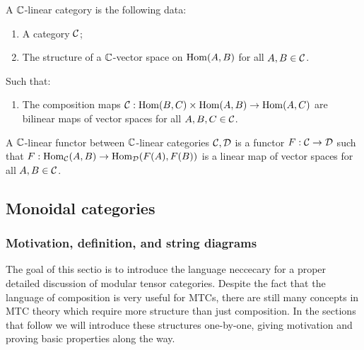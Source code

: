 
\begin{defn} A ${\mathbb C}$-linear category is the following data:

\begin{enumerate}
\item A category ${\mathcal C}$;
\item The structure of a ${\mathbb C}$-vector space on $\operatorname{Hom}(A,B)$ for all $A,B\in {\mathcal C}$.

\end{enumerate}

Such that:

\begin{enumerate}

\item The composition maps ${\mathcal C}:\operatorname{Hom}(B,C)\times \operatorname{Hom}(A,B)\to \operatorname{Hom}(A,C)$ are bilinear maps of vector spaces for all $A,B,C\in {\mathcal C}$.
\end{enumerate}

\raggedleft\qedsymbol{}
\end{defn}



\begin{defn} A ${\mathbb C}$-linear functor between ${\mathbb C}$-linear categories ${\mathcal C},{\mathcal D}$ is a functor $F:{\mathcal C}\to{\mathcal D}$ such that $F:\operatorname{Hom}_{\mathcal C}(A,B)\to\operatorname{Hom}_{\mathcal D}(F(A),F(B))$ is a linear map of vector spaces for all $A,B\in{\mathcal C}$.

\raggedleft\qedsymbol{}
\end{defn}



\subsection{Monoidal categories}

\subsubsection{Motivation, definition, and string diagrams}


The goal of this sectio is to introduce the language neccecary for a proper detailed discussion of modular tensor categories. Despite the fact that the language of composition is very useful for MTCs, there are still many concepts in MTC theory which require more structure than just composition. In the sections that follow we will introduce these structures one-by-one, giving motivation and proving basic properties along the way.


